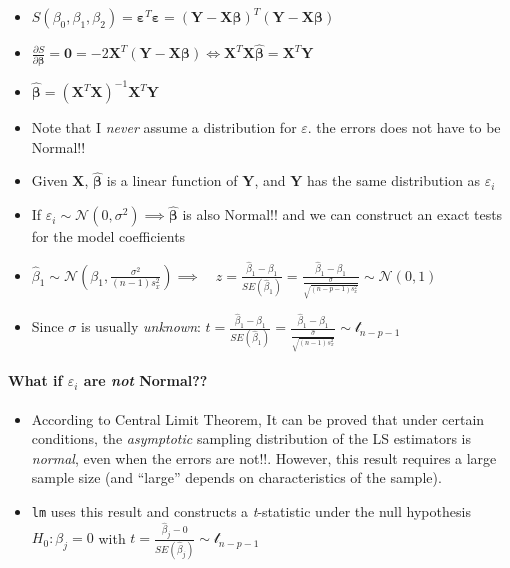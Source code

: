 \documentclass[]{article}
\providecommand{\tightlist}{%
  \setlength{\itemsep}{0pt}\setlength{\parskip}{0pt}}
\let\oldparagraph\paragraph
\renewcommand{\paragraph}[1]{\oldparagraph{#1}\mbox{}}
\begin{document}
\begin{itemize}
\tightlist
\item
  \(S(\beta_0,\beta_1,\beta_2)=\mathbf{\varepsilon}^T\mathbf{\varepsilon}=(\mathbf{Y}- \mathbf{X} \mathbf{\beta})^T (\mathbf{Y} - \mathbf{X} \mathbf{\beta})\)\\
\item
  \(\frac{\partial{S}}{\partial{\mathbf{\beta}}}=\mathbf{0}= -2\mathbf{X}^T(\mathbf{Y}-\mathbf{X}\mathbf{\beta}) \iff \mathbf{X}^T\mathbf{X}\hat{\mathbf{\beta}}=\mathbf{X}^T\mathbf{Y}\)\\
\item
  \(\hat{\mathbf{\beta}}=(\mathbf{X}^T\mathbf{X})^{-1}\mathbf{X}^T\mathbf{Y}\)\\
\item
  Note that I \emph{never} assume a distribution for \(\varepsilon\).
  the errors does not have to be Normal!!
\item
  Given \(\mathbf{X}\), \(\hat{\mathbf{\beta}}\) is a linear function of
  \(\mathbf{Y}\), and \(\mathbf{Y}\) has the same distribution as
  \(\varepsilon_i\)
\item
  If
  \(\varepsilon_i \sim \mathcal{N}(0,\sigma^2) \implies \hat{\mathbf{\beta}}\)
  is also Normal!! and we can construct an exact tests for the model
  coefficients
\item
  \(\hat{\beta}_1 \sim \mathcal{N}\left(\beta_1,\frac{\sigma^2}{(n-1)s_x^2}\right) \implies \quad z=\frac{\hat{\beta}_1-\beta_1}{SE(\hat{\beta}_1)}=\frac{\hat{\beta}_1-\beta_1}{\frac{\sigma}{\sqrt{(n-p-1)s^2_x}}} \sim \mathcal{N}(0,1)\)
\item
  Since \(\sigma\) is usually \emph{unknown}:
  \(t=\frac{\hat{\beta}_1-\beta_1}{SE(\hat{\beta}_1)}=\frac{\hat{\beta}_1-\beta_1}{\frac{\hat{\sigma}}{\sqrt{(n-1)s^2_x}}} \sim \mathcal{t}_{n-p-1}\)
\end{itemize}

\hypertarget{what-if-varepsilon_i-are-not-normal}{%
\paragraph{\texorpdfstring{What if \(\varepsilon_i\) are
\textbf{\emph{not}}
Normal??}{What if \textbackslash{}varepsilon\_i are not Normal??}}\label{what-if-varepsilon_i-are-not-normal}}

\begin{itemize}
\tightlist
\item
  According to Central Limit Theorem, It can be proved that under
  certain conditions, the \emph{asymptotic} sampling distribution of the
  LS estimators is \emph{normal}, even when the errors are not!!.
  However, this result requires a large sample size (and ``large''
  depends on characteristics of the sample).\\
\item
  \texttt{lm} uses this result and constructs a \emph{t}-statistic under
  the null hypothesis \(H_0: \beta_j=0\) with
  \(t=\frac{\hat{\beta}_j-0}{SE(\hat{\beta}_j)}\sim \mathcal{t}_{n-p-1}\)
\end{itemize}
\end{document}
